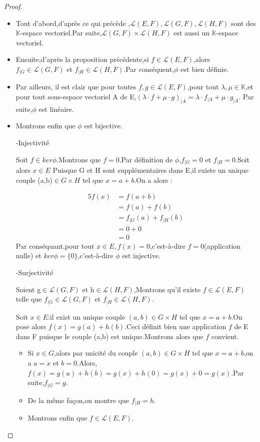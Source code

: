 \documentclass[12pt]{book}
\theoremstyle{definition}\newtheorem{dfn}{Définition}[chapter]
\theoremstyle{plain}\newtheorem{thm}{Théorème}[chapter]
\theoremstyle{plain}\newtheorem{prp}{Proposition}[chapter]
\theoremstyle{plain}\newtheorem{lem}{\bf Lemme}[chapter]
\theoremstyle{plain}\newtheorem{axm}{\bf Axiome}[chapter]
\theoremstyle{plain}\newtheorem{lmm}{\bf Lemme}[chapter]
\theoremstyle{plain}\newtheorem{cor}{\bf Corollaire}[chapter]
\theoremstyle{remark}\newtheorem{rem}{Remarque}[chapter]
\begin{document}
\begin{proof}
        \begin{itemize}


\item Tout d'abord,d'après ce qui précède ,$\mathcal{L}(E,F),\mathcal{L}(G,F),\mathcal{L}(H,F)$ sont des $\mathbb{K}$-espace vectoriel.Par suite,$\mathcal{L}(G,F)\times\mathcal{L}(H,F)$ est aussi un
$\mathbb{K}$-espace vectoriel.
\item Ensuite,d'après la proposition précédente,si $f\in\mathcal{L}(E,F)$,alors $f_{|G}\in\mathcal{L}(G,F)$
et $f_{|H}\in\mathcal{L}(H,F)$.Par conséquent,$\phi$ est bien définie.
\item Par ailleurs, il est clair que pour toutes $f,g\in
\mathcal{L}(E,F)$,pour tout $\lambda,\mu\in\mathbb{K}$,et pour tout sous-espace vectoriel A de E,$(\lambda\cdot f+\mu\cdot g)
_{|A}=\lambda\cdot f_{|A}+\mu\cdot g_{|A}$.
Par suite,$\phi$ est linéaire.
\item Montrons enfin que $\phi$ est bijective.

-Injectivité

Soit $f\in ker\phi$.Montrons que $f=0$.Par définition de $\phi$,$f_{|G}=0$ et $f_{|H}=0$.Soit alors $x\in E$
Puisque G et H sont supplémentaires dans E,il existe un unique couple (a,b)$\in G\times H$ tel que $x=a+b$.On a alors :

\begin{alignat*}{5}
    f(x)&=f(a+b)\\
    &=f(a)+f(b)\\
    &=f_{|G}(a)+f_{|H}(b)\\
    &=0+0\\
    &=0
\end{alignat*}
Par conséquant,pour tout $x\in E,f(x)=0$,c'est-à-dire $f=0$(application nulle) et $ker\phi=\{0\}$,c'est-à-dire $\phi$ est injective.

-Surjectivité

Soient g$\in \mathcal{L}(G,F)$ et h$\in \mathcal{L}(H,F)$,Montrons qu'il existe $f\in \mathcal{L}(E,F)$ telle que
$f_{|G}\in\mathcal{L}(G,F)$
et $f_{|H}\in\mathcal{L}(H,F)$.

Soit $x\in E$:il exist un unique couple $(a,b)\in G\times H$ tel que $x=a+b$.On pose alors $f(x)=g(a)+h(b)$.Ceci définit bien une application $f$ de E dans F puisque le couple (a,b)
est unique.Montrons alors que
$f$ convient.
\begin{itemize}
 \item Si $x\in G$,alors par unicité du couple $(a,b)\in G\times H$ tel que $x=a+b$,on a $a=x$ et $b=0$.Alors,$f(x)=g(a)+h(b)=g(x)+h(0)=g(x)+0=g(x)$.Par suite,$f_{|G}=g$.
 \item De la même façon,on montre que $f_{|H}=h$.
 \item Montrons enfin que $f\in\mathcal{L}(E,F)$.


\end{itemize}
\end{itemize}
\end{proof}
\end{document}
